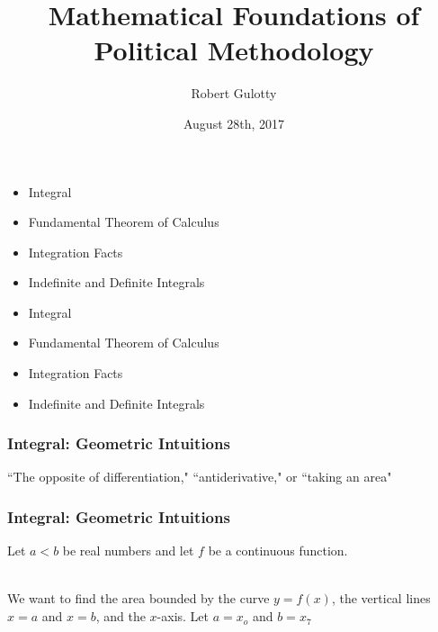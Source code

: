 \documentclass[handout]{beamer}
\title[PLSC 43401] %
{Mathematical Foundations of Political Methodology}
\author{Robert Gulotty}
\institute[University of Chicago]{Department of Political Science \\  University of Chicago}
\date{August 28th, 2017}
\numberwithin{equation}{section}
\begin{document}
\begin{frame}
\titlepage
\end{frame}



\begin{frame}

\begin{itemize}
\item \textcolor{myblack}{Integral}
\item \textcolor{myblack}{Fundamental Theorem of Calculus}
\item \textcolor{myblack}{Integration Facts}
\item \textcolor{myblack}{Indefinite and Definite Integrals}
\end{itemize}

\end{frame}



\begin{frame}

\begin{itemize}
\item \textcolor{myblack}{Integral}
\item \textcolor{mygray}{Fundamental Theorem of Calculus}
\item \textcolor{mygray}{Integration Facts}
\item \textcolor{mygray}{Indefinite and Definite Integrals}
\end{itemize}

\end{frame}



\begin{frame}
\frametitle{Integral: Geometric Intuitions}

``The opposite of differentiation," ``antiderivative," or ``taking an area"
 
\vspace{.2in}
\begin{center}
\end{center}
 
\end{frame}



\begin{frame}
\frametitle{Integral: Geometric Intuitions}

Let $a<b$ be real numbers and let $f$ be a continuous function. \pause
 
\ \\We want to find the area bounded by the curve $y=f(x)$, the vertical lines $x=a$ and $x=b$, and the $x$-axis.  Let $a=x_o$ and $b=x_7$

\begin{center}
\end{center}

\end{frame}
\end{document}
